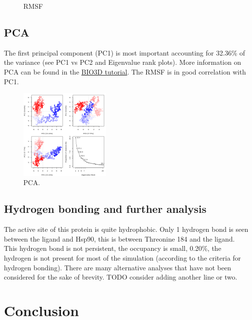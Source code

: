 \documentclass[twocolumn]{bmcart}%
\begin{document}
\begin{figure}[h!]
  \caption{
      RMSF}
\label{fig:rmsf}
      \end{figure}

\subsection*{PCA}

The first principal component (PC1) is most important accounting for
32.36\% of the variance (see PC1 vs PC2 and Eigenvalue rank plots). More
information on PCA can be found in the
\href{http://thegrantlab.org/bio3d/tutorials/trajectory-analysis}{BIO3D
tutorial}. The RMSF is in good correlation with PC1.

\begin{figure}[h!]
  \includegraphics[width=0.4\textwidth]{htmd_analysis_pca}
  \caption{
      PCA.}
 \label{fig:pca}
 \end{figure}

\subsection*{Hydrogen bonding and further analysis}
The active site of this protein is quite hydrophobic. Only 1 hydrogen
bond is seen between the ligand and Hsp90, this is between Threonine 184
and the ligand. This hydrogen bond is not persistent, the occupancy is
small, 0.20\%, the hydrogen is not present for most of the simulation
(according to the criteria for hydrogen bonding).
There are many alternative analyses that have not been considered for the sake of brevity. TODO consider adding another line or two.


\hypertarget{conclusion}{%
\section*{Conclusion}\label{conclusion}}
\end{document}
